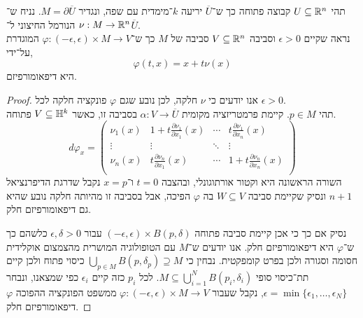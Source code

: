 \question{}
תהי $U \subseteq \mathbb{R}^n$ קבוצה פתוחה כך ש־$\overline{U}$ יריעה $k$־מימדית עם שפה, ונגדיר $M = \partial \overline{U}$.
נניח ש־$\nu : M \to \mathbb{R}^n$ הנורמל החיצוני ל־$\overline{U}$. \\
נראה שקיים $\epsilon > 0$ וסביבה $V \subseteq \mathbb{R}^n$ סביבה של $M$ כך ש־$\varphi : (-\epsilon, \epsilon) \times M \to V$ המוגדרת על־ידי,
\[
	\varphi(t, x)
	= x + t \nu(x)
\]
היא דיפאומורפיזם.
\begin{proof}
	אנו יודעים כי $\nu$ חלקה, לכן נובע שגם $\varphi$ פונקציה חלקה לכל $\epsilon > 0$. \\
	תהי $p \in M$.
	קיימת פרמטריזציה מקומית $\alpha : V \to \overline{U}$ בסביבה זו, כאשר $V \subseteq \mathbb{H}^k$ פתוחה.
	\[
		d\varphi_x
		= \begin{pmatrix}
			\nu_1(x) & 1 + t \frac{\partial \nu_1}{\partial x_1}(x) & \cdots & t \frac{\partial \nu_1}{\partial x_n}(x) \\
			\vdots & \vdots & \ddots & \vdots \\
			\nu_n(x) & t \frac{\partial \nu_n}{\partial x_1}(x) & \cdots & 1 + t \frac{\partial \nu_n}{\partial x_n}(x) \\
		\end{pmatrix}
	\]
	השורה הראשונה היא וקטור אורתוגונלי, ובהצבה $t = 0$ ו־$x = p$ נקבל שדרגת הדיפרנציאל $n + 1$ ונסיק שקיימת סביבה $W \subseteq V$ בה $\varphi$ הפיכה, אבל בסביבה זו מהיותה חלקה נובע שהיא גם דיפאומורפיזם חלק.

	נסיק אם כך כי אכן קיימת סביבה פתוחה $(-\epsilon, \epsilon) \times B(p, \delta)$ עבור $\epsilon, \delta > 0$ כלשהם כך ש־$\varphi$ היא דיפאומורפיזם חלק.
	אנו יודעים ש־$M$ עם הטופולוגיה המושרית מהצמצום אוקלידית חסומה וסגורה ולכן בפרט קומפקטית.
	נבחין כי $\bigcup_{p \in M} B(p, \delta_p) \supseteq M$ כיסוי פתוח ולכן קיים תת־כיסוי סופי $M \subseteq \bigcup_{i = 1}^N B(p_i, \delta_i)$.
	לכל $p_i$ כזה קיים $\epsilon_i$ כפי שמצאנו, ונבחר $\epsilon = \min\{ \epsilon_1, \ldots, \epsilon_N \}$, נקבל שעבור $\varphi : (-\epsilon, \epsilon) \times M \to V$ ממשפט הפונקציה ההפוכה $\varphi$ דיפאומורפיזם חלק.
\end{proof}


